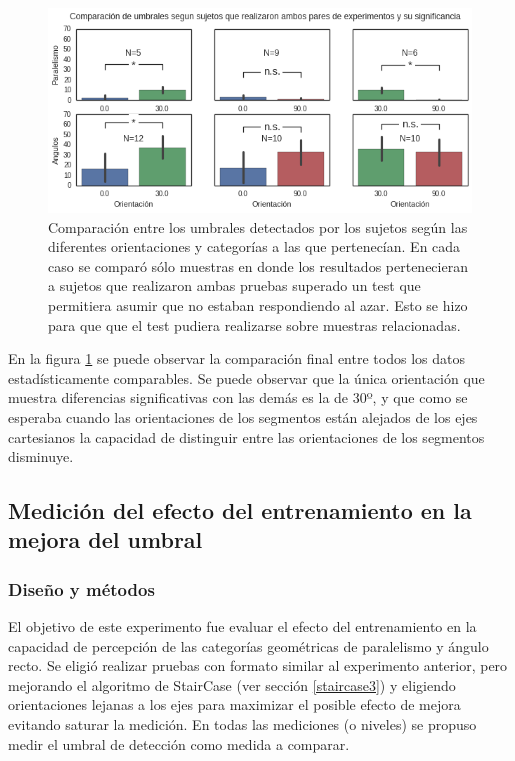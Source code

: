 \documentclass{article}
\numberwithin{figure}{section}
\begin{document}
	\begin{figure}
        \center
        \includegraphics[width=\textwidth]{Imagenes/Exp1_ResultadosDetalle.png}
        \caption{Comparación entre los umbrales detectados por los sujetos según las diferentes orientaciones y categorías a las que pertenecían. En cada caso se comparó sólo muestras en donde los resultados pertenecieran a sujetos que realizaron ambas pruebas superado un test que permitiera asumir que no estaban respondiendo al azar. Esto se hizo para que que el test pudiera realizarse sobre muestras relacionadas.}
        \label{fig:Exp1_ResultadosDetalle}
    \end{figure}  
    
    En la figura \ref{fig:Exp1_ResultadosDetalle} se puede observar la comparación final entre todos los datos estadísticamente comparables. Se puede observar que la única orientación que muestra diferencias significativas con las demás es la de 30º, y que como se esperaba cuando las orientaciones de los segmentos están alejados de los ejes cartesianos la capacidad de distinguir entre las orientaciones de los segmentos disminuye. 
    
    
    \subsection{Medición del efecto del entrenamiento en la mejora del umbral}
    
    \subsubsection{Diseño y métodos} \label{seccion:Exp2_Diseno}
    
    El objetivo de este experimento fue evaluar el efecto del entrenamiento en la capacidad de percepción de las categorías geométricas de paralelismo y ángulo recto. Se eligió realizar pruebas con formato similar al experimento anterior, pero mejorando el algoritmo de StairCase (ver sección \ref{staircase3}) y eligiendo orientaciones lejanas a los ejes para maximizar el posible efecto de mejora evitando saturar la medición. En todas las mediciones (o niveles) se propuso medir el umbral de detección como medida a comparar.
    
\end{document}
